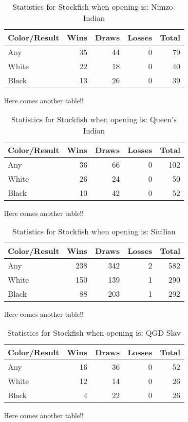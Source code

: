 \documentclass{article}
\begin{document}
\begin{table}[h!]
\centering
\begin{tabular}{l|rrrr}
Color/Result & Wins & Draws & Losses & Total\\
\hline
Any & 35 & 44 & 0 & 79\\
White & 22 & 18 & 0 & 40\\
Black & 13 & 26 & 0 & 39\\
\end{tabular}
\caption{Statistics for Stockfish when opening is: Nimzo-Indian}
\end{table}
Here comes another table!!

\begin{table}[h!]
\centering
\begin{tabular}{l|rrrr}
Color/Result & Wins & Draws & Losses & Total\\
\hline
Any & 36 & 66 & 0 & 102\\
White & 26 & 24 & 0 & 50\\
Black & 10 & 42 & 0 & 52\\
\end{tabular}
\caption{Statistics for Stockfish when opening is: Queen's Indian}
\end{table}
Here comes another table!!

\begin{table}[h!]
\centering
\begin{tabular}{l|rrrr}
Color/Result & Wins & Draws & Losses & Total\\
\hline
Any & 238 & 342 & 2 & 582\\
White & 150 & 139 & 1 & 290\\
Black & 88 & 203 & 1 & 292\\
\end{tabular}
\caption{Statistics for Stockfish when opening is: Sicilian}
\end{table}
Here comes another table!!

\begin{table}[h!]
\centering
\begin{tabular}{l|rrrr}
Color/Result & Wins & Draws & Losses & Total\\
\hline
Any & 16 & 36 & 0 & 52\\
White & 12 & 14 & 0 & 26\\
Black & 4 & 22 & 0 & 26\\
\end{tabular}
\caption{Statistics for Stockfish when opening is: QGD Slav}
\end{table}
Here comes another table!!
\end{document}
